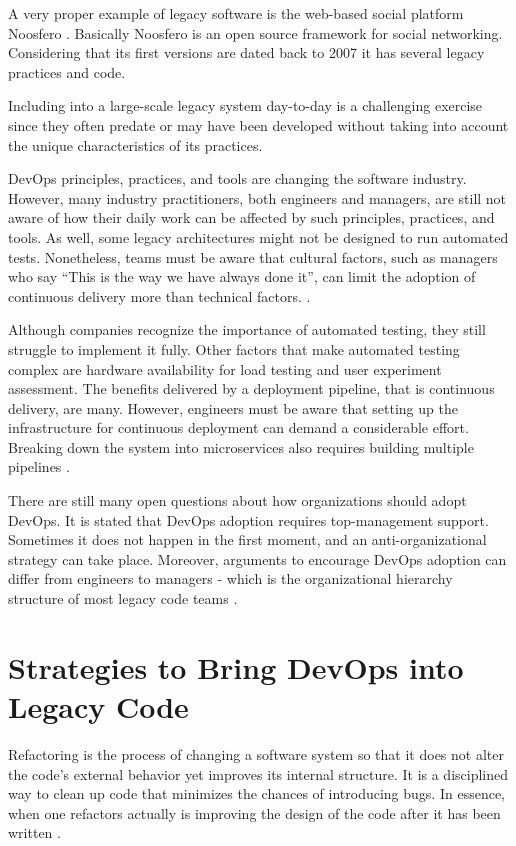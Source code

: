 A very proper example of legacy software is the web-based social platform
Noosfero \cite{noosfero}. Basically Noosfero is an open source framework for
social networking. Considering that its first versions are dated back to 2007 it
has several legacy practices and code.

Including \devops into a large-scale legacy system day-to-day is a challenging
exercise since they often predate \devops or may have been developed without
taking into account the unique characteristics of its practices.

DevOps principles, practices, and tools are changing the software industry.
However, many industry practitioners, both engineers and managers, are still not
aware of how their daily work can be affected by such principles, practices, and
tools. As well, some legacy architectures might not be designed to run automated
tests. Nonetheless, teams must be aware that cultural factors, such as managers
who say “This is the way we have always done it”, can limit the adoption of
continuous delivery more than technical factors. \cite{rocha2019}.

Although companies recognize the importance of automated testing, they still
struggle to implement it fully. Other factors that make automated testing
complex are hardware availability for load testing and user experiment
assessment. The benefits delivered by a deployment pipeline, that is continuous
delivery,  are many. However, engineers must be aware that setting up the
infrastructure for continuous deployment can demand a considerable effort.
Breaking down the system into microservices also requires building multiple
pipelines \cite{rocha2019}.

There are still many open questions about how organizations should adopt DevOps.
It is stated that DevOps adoption requires top-management support. Sometimes it
does not happen in the first moment, and an anti-organizational strategy can
take place. Moreover, arguments to encourage DevOps adoption can differ from
engineers to managers - which is the organizational hierarchy structure of most
legacy code teams \cite{rocha2019}.

\section{Strategies to Bring DevOps into Legacy Code}

Refactoring is the process of changing a software system so that it does not
alter the code's external behavior yet improves its internal structure. It is a
disciplined way to clean up code that minimizes the chances of introducing bugs.
In essence, when one refactors actually is improving the design of the code
after it has been written \cite{fowler2002}.

